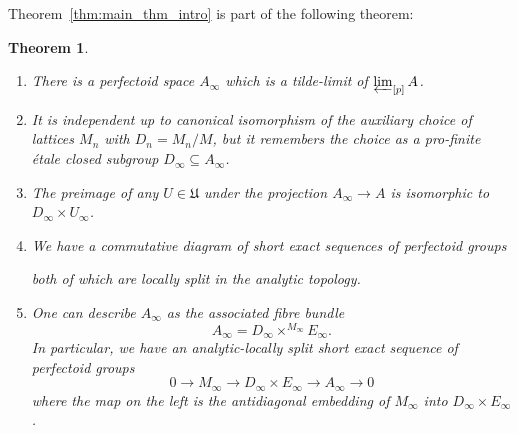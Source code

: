 \documentclass[10pt,oneside]{amsart}
\newtheorem{theorem}{Theorem}[section]
\theoremstyle{definition}
\begin{document}
Theorem~\ref{thm:main_thm_intro} is part of the following theorem:	
	\begin{theorem}\label{tilde-limit of tilde-limits of partial towers is tilde-limit of whole tower}
		\begin{enumerate}
		\item There is a perfectoid space  $A_\infty$ which is a tilde-limit of $\varprojlim_{[p]}A$.
		\item It is independent up to canonical isomorphism of the auxiliary choice of lattices $M_n$ with $D_n=M_n/M$, but it remembers the choice as a pro-finite \'etale closed subgroup $D_\infty \subseteq A_\infty$. 
		\item The preimage of any $U\in \mathfrak U$ under the projection $A_\infty \rightarrow A$ is isomorphic to $D_\infty \times U_\infty$. 
		
		\item 	We have a commutative diagram of short exact sequences of perfectoid groups		
		\begin{center}
		\end{center}
		both of which are locally split in the analytic topology.
		\item One can describe $A_\infty$ as the associated fibre bundle
		\[A_\infty = D_\infty\times^{M_\infty}E_\infty.\]
		In particular, we have an analytic-locally split short exact sequence of perfectoid groups
		\[0\rightarrow M_\infty\rightarrow D_\infty \times E_\infty \rightarrow A_\infty\rightarrow 0\]
		where the map on the left is the antidiagonal embedding of $M_\infty$ into $D_\infty\times E_\infty$.
		\end{enumerate}
	\end{theorem}
\end{document}
